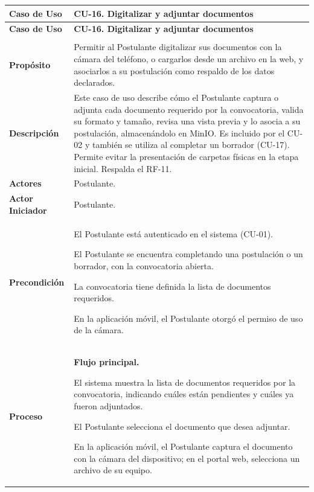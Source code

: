 \begin{longtable}{>{\raggedright\arraybackslash}p{2.9cm} >{\raggedright\arraybackslash}p{12.6cm}}
\toprule
\textbf{Caso de Uso} & \textbf{CU-16. Digitalizar y adjuntar documentos} \\
\midrule
\endfirsthead
\toprule
\textbf{Caso de Uso} & \textbf{CU-16. Digitalizar y adjuntar documentos} \\
\midrule
\endhead
\endfoot
\bottomrule
\multicolumn{2}{l}{\textit{Nota.} Elaboración propia.} \\
\endlastfoot
\textbf{Propósito} & Permitir al Postulante digitalizar sus documentos con la cámara del teléfono, o cargarlos desde un archivo en la web, y asociarlos a su postulación como respaldo de los datos declarados. \\
\midrule
\textbf{Descripción} & Este caso de uso describe cómo el Postulante captura o adjunta cada documento requerido por la convocatoria, valida su formato y tamaño, revisa una vista previa y lo asocia a su postulación, almacenándolo en MinIO. Es incluido por el CU-02 y también se utiliza al completar un borrador (CU-17). Permite evitar la presentación de carpetas físicas en la etapa inicial. Respalda el RF-11. \\
\midrule
\textbf{Actores} & Postulante. \\
\midrule
\textbf{Actor Iniciador} & Postulante. \\
\midrule
\textbf{Precondición} & \vspace{-\baselineskip}\begin{cuvin}
    \item El Postulante está autenticado en el sistema (CU-01).
    \item El Postulante se encuentra completando una postulación o un borrador, con la convocatoria abierta.
    \item La convocatoria tiene definida la lista de documentos requeridos.
    \item En la aplicación móvil, el Postulante otorgó el permiso de uso de la cámara.
\end{cuvin} \\
\midrule
\textbf{Proceso} & \textbf{Flujo principal.}
\begin{cupasos}
    \item El sistema muestra la lista de documentos requeridos por la convocatoria, indicando cuáles están pendientes y cuáles ya fueron adjuntados.
    \item El Postulante selecciona el documento que desea adjuntar.
    \item En la aplicación móvil, el Postulante captura el documento con la cámara del dispositivo; en el portal web, selecciona un archivo de su equipo.

\end{cupasos}
\end{longtable}
